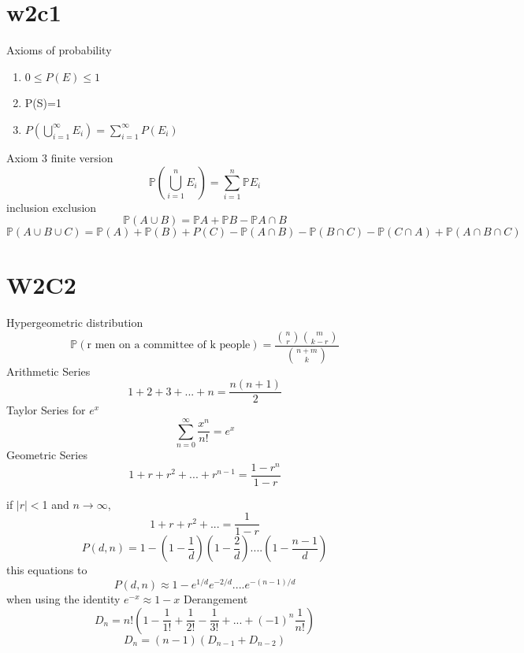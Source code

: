 \documentclass{article}
\begin{document}
\section{w2c1}
Axioms of probability
\begin{enumerate}
  \item 0$\leq P(E)\leq 1$
  \item P(S)=1
  \item $P(\bigcup_{i=1}^{\infty}E_i)=\sum_{i=1}^{\infty}P(E_i)$
\end{enumerate}
Axiom 3 finite version\\
$$
\mathbb{P}(\bigcup_{i=1}^{n}E_i)=\sum_{i=1}^n\mathbb{P}{E_i}
$$
inclusion exclusion
$$
\mathbb{P}(A \cup B)=\mathbb{P}A+\mathbb{P}B-\mathbb{P}{A\cap B}
$$
$$
\mathbb{P}(A\cup B \cup C )=\mathbb{P}(A)+\mathbb{P}(B)+P(C)-\mathbb{P}(A\cap B)- \mathbb{P}(B\cap C)-\mathbb{P}(C\cap A)+\mathbb{P}(A\cap B \cap C)
$$
\section{W2C2}
Hypergeometric distribution\\
$$
\mathbb {P}(\text{r men on a committee of k people})=\frac{{n \choose r}{m \choose k-r}}{{n+m \choose k}}
$$
Arithmetic Series
$$
1+2+3+...+n=\frac{n(n+1)}{2}
$$
Taylor Series for $e^x$
$$
\sum_{n=0}^{\infty}\frac{x^n}{n!}=e^x
$$
Geometric Series
$$
1+r+r^2+...+r^{n-1}=\frac{1-r^n}{1-r}
$$

if $|r|<$1 and $n\rightarrow \infty$,
$$
1+r+r^2+...=\frac{1}{1-r}
$$
$$
P(d,n)=1-(1-\frac{1}{d})(1-\frac{2}{d})....(1-\frac{n-1}{d})
$$
this equations to
$$
P(d,n)\approx 1-e^{1/d}e^{-2/d}....e^{-(n-1)/d}
$$
when using the identity $e^{-x}\approx 1-x$
Derangement
$$
D_n=n!(1-\frac{1}{1!}+\frac{1}{2!}-\frac{1}{3!}+...+(-1)^n\frac{1}{n!})
$$
$$
D_n=(n-1)(D_{n-1}+D_{n-2})
$$
\end{document}
